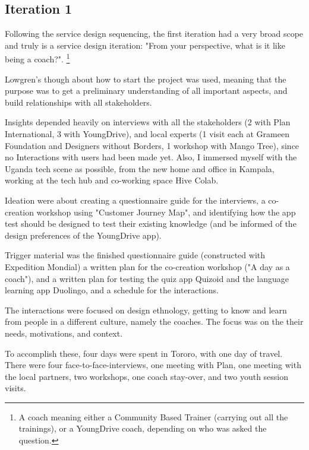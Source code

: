 \subsection{Iteration 1}


Following the service design sequencing, the first iteration had a very broad scope and truly is a service design iteration: "From your perspective, what is it like being a coach?". \footnote{A coach meaning either a Community Based Trainer (carrying out all the trainings), or a YoungDrive coach, depending on who was asked the question.}

Lowgren's though about how to start the project was used, meaning that the purpose was to get a preliminary understanding of all important aspects, and build relationships with all stakeholders.

Insights depended heavily on interviews with all the stakeholders  (2 with Plan International, 3 with YoungDrive), and local experts (1 visit each at Grameen Foundation and Designers without Borders, 1 workshop with Mango Tree), since no Interactions with users had been made yet. Also, I immersed myself with the Uganda tech scene as possible, from the new home and office in Kampala, working at the tech hub and co-working space Hive Colab.

Ideation were about creating a questionnaire guide for the interviews, a co-creation workshop using "Customer Journey Map", and identifying how the app test should be designed to test their existing knowledge (and be informed of the design preferences of the YoungDrive app).

Trigger material was the finished questionnaire guide (constructed with Expedition Mondial) a written plan for the co-creation workshop ("A day as a coach"), and a written plan for testing the quiz app Quizoid and the language learning app Duolingo, and a schedule for the interactions.

The interactions were focused on design ethnology, getting to know and learn from people in a different culture, namely the coaches. The focus was on the their needs, motivations, and context.

To accomplish these, four days were spent in Tororo, with one day of travel. There were four face-to-face-interviews,
one meeting with Plan, one meeting with the local partners, two workshops, one coach stay-over, and two youth session visits.
